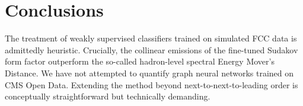 \section{Conclusions}\label{sec:conclusions}

The treatment of weakly supervised classifiers trained on simulated FCC
data is admittedly heuristic. Crucially, the collinear emissions of the
fine-tuned Sudakov form factor outperform the so-called hadron-level
spectral Energy Mover's Distance. We have not attempted to quantify
graph neural networks trained on CMS Open Data. Extending the method
beyond next-to-next-to-leading order is conceptually straightforward but
technically demanding.

